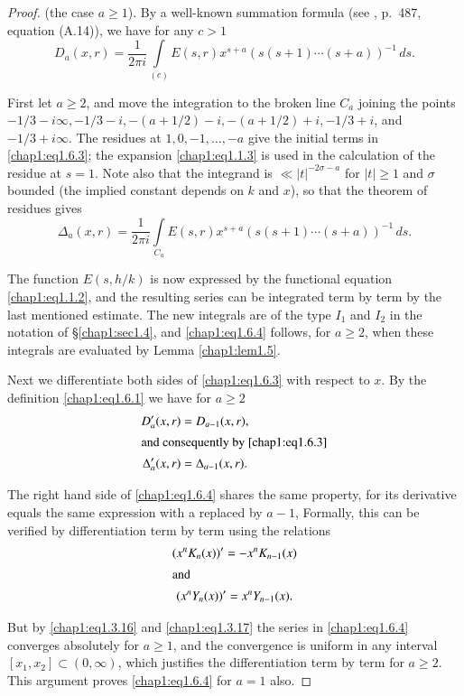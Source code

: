 \begin{proof}
(the case $a\geq 1$). By a well-known summation formula (see
\cite{key13}, p.~487, equation (A.14)), we have for any $c>1$
$$
D_a(x,r)=\frac{1}{2\pi i}\int\limits_{(c)}E(s,r)x^{s+a}(s(s+1)\cdots
(s+a))^{-1} \,ds.
$$

First let $a\geq 2$, and move the integration to the broken line $C_a$
joining the points $-1/3-i\infty, -1/3-i, -(a+1/2)-i, -(a+1/2)+i,
-1/3+i$, and $-1/3+i\infty$. The residues at $1,0,-1,\ldots,-a$ give
the initial terms in \eqref{chap1:eq1.6.3}; the expansion
\eqref{chap1:eq1.1.3} is used in the calculation of the residue at
$s=1$. Note also that the integrand is $\ll |t|^{-2\sigma-a}$ for
$|t|\geq 1$ and $\sigma$ bounded (the implied constant depends on $k$
and $x$), so that the theorem of residues gives
$$
\Delta_a(x,r)=\frac{1}{2\pi i}\int\limits_{C_a}E(s,r)x^{s+a}(s(s+1)
\cdots(s+a))^{-1}\,ds.
$$

The function $E(s,h/k)$ is now expressed by the functional equation
\eqref{chap1:eq1.1.2}, and the resulting series can be integrated term
by term by the last mentioned estimate. The new integrals are of the
type $I_1$ and $I_2$ in the notation of \S \ref{chap1:sec1.4}, and
\eqref{chap1:eq1.6.4} follows, for $a\geq 2$, when these integrals are
evaluated by Lemma \ref{chap1:lem1.5}.

Next we differentiate both sides of \eqref{chap1:eq1.6.3} with respect
to $x$. By the definition \eqref{chap1:eq1.6.1} we have for $a\geq 2$
\begin{gather}
D_a'(x,r)=D_{a-1}(x,r),\label{chap1:eq1.6.6}\\
\intertext{and consequently by \eqref{chap1:eq1.6.3}}
\Delta_a'(x,r)=\Delta_{a-1}(x,r).\label{chap1:eq1.6.7}
\end{gather}\pageoriginale

The right hand side of \eqref{chap1:eq1.6.4} shares the same property,
for its derivative equals the same expression with a replaced by
$a-1$, Formally, this can be verified by differentiation term by term
using the relations 
\begin{gather}
(x^nK_n(x))'=-x^nK_{n-1}(x)\label{chap1:eq1.6.8}\\
\intertext{and}
(x^nY_n(x))'=x^nY_{n-1}(x).\label{chap1:eq1.6.9}
\end{gather}

But by \eqref{chap1:eq1.3.16} and \eqref{chap1:eq1.3.17} the series in
\eqref{chap1:eq1.6.4} converges absolutely for $a\geq 1$, and the
convergence is uniform in any interval $[x_1,x_2]\subset (0,\infty)$,
which justifies the differentiation term by term for $a\geq 2$. This
argument proves \eqref{chap1:eq1.6.4} for $a=1$ also. 


\end{proof}
